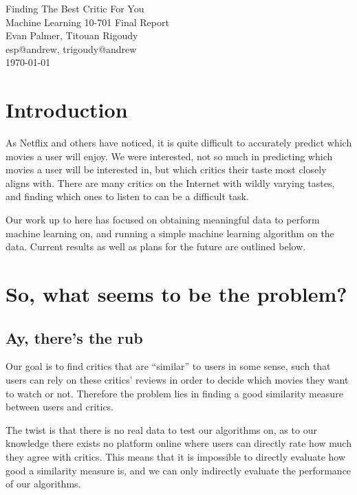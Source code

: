 \documentclass[12pt]{article}
\makeatletter
\newcommand{\myname}{Evan Palmer, Titouan Rigoudy}
\newcommand{\myandrew}{esp@andrew, trigoudy@andrew}
\newcommand{\thedate}{\today}
\makeatother
\begin{document}
	\medskip    
	\thispagestyle{plain}
	\begin{center}                 
	{\LARGE Finding The Best Critic For You} \\
	\medskip
	Machine Learning 10-701 Final Report \\
	\smallskip
	\myname \\
	\myandrew \\
	\thedate \\
	\end{center}
	\vspace{0.5cm}

\section{Introduction}

As Netflix and others have noticed, it is quite difficult to accurately predict which movies a user will enjoy. We were interested, not so much in predicting which movies a user will be interested in, but which critics their taste most closely aligns with. There are many critics on the Internet with wildly varying tastes, and finding which ones to listen to can be a difficult task.

Our work up to here has focused on obtaining meaningful data to perform machine learning on, and running a simple machine learning algorithm on the data. Current results as well as plans for the future are outlined below.

\section{So, what seems to be the problem?}

\subsection{Ay, there's the rub} %

Our goal is to find critics that are ``similar'' to users in some sense, such
that users can rely on these critics' reviews in order to decide which movies
they want to watch or not. Therefore the problem lies in finding a good
similarity measure between users and critics.

The twist is that there is no real data to test our algorithms on, as to our
knowledge there exists no platform online where users can directly rate how
much they agree with critics. This means that it is impossible to directly
evaluate how good a similarity measure is, and we can only indirectly evaluate
the performance of our algorithms.
\end{document}
